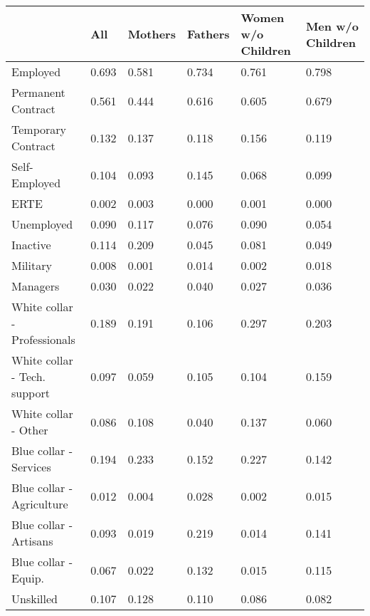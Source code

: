 \begin{tabular}{llllll}
\toprule
{} &     All & Mothers & Fathers & Women w/o Children & Men w/o Children \\
\midrule
Employed                     &   0.693 &   0.581 &   0.734 &              0.761 &            0.798 \\
Permanent Contract           &   0.561 &   0.444 &   0.616 &              0.605 &            0.679 \\
Temporary Contract           &   0.132 &   0.137 &   0.118 &              0.156 &            0.119 \\
Self-Employed                &   0.104 &   0.093 &   0.145 &              0.068 &            0.099 \\
ERTE                         &   0.002 &   0.003 &   0.000 &              0.001 &            0.000 \\
Unemployed                   &   0.090 &   0.117 &   0.076 &              0.090 &            0.054 \\
Inactive                     &   0.114 &   0.209 &   0.045 &              0.081 &            0.049 \\
Military                     &   0.008 &   0.001 &   0.014 &              0.002 &            0.018 \\
Managers                     &   0.030 &   0.022 &   0.040 &              0.027 &            0.036 \\
White collar - Professionals &   0.189 &   0.191 &   0.106 &              0.297 &            0.203 \\
White collar - Tech. support &   0.097 &   0.059 &   0.105 &              0.104 &            0.159 \\
White collar - Other         &   0.086 &   0.108 &   0.040 &              0.137 &            0.060 \\
Blue collar - Services       &   0.194 &   0.233 &   0.152 &              0.227 &            0.142 \\
Blue collar - Agriculture    &   0.012 &   0.004 &   0.028 &              0.002 &            0.015 \\
Blue collar - Artisans       &   0.093 &   0.019 &   0.219 &              0.014 &            0.141 \\
Blue collar - Equip.         &   0.067 &   0.022 &   0.132 &              0.015 &            0.115 \\
Unskilled                    &   0.107 &   0.128 &   0.110 &              0.086 &            0.082 \\

\end{tabular}
